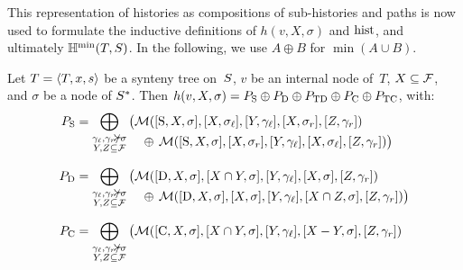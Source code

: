This representation of histories as compositions of sub-histories and paths is now used to formulate the inductive definitions of \(h(v, X, \sigma)\) and \(\mathrm{hist}\), and ultimately \(\mathbb{H}^{\mathrm{min}}(T, S)\).
In the following, we use \(A \oplus B\) for \(\min(A \cup B)\).

\begin{theorem}\label{thm:synesth:minimal-history}
    Let \(T = \left\langle T, x, s\right\rangle\) be a synteny tree on~\(S\),
    \(v\) be an internal node of~\(T\),
    \(X \subseteq \mathcal{F}\), and
    \(\sigma\) be a node of \(S^*\).
    Then \(h(v, X, \sigma) = P_{\mathrm{S}} \oplus P_{\mathrm{D}} \oplus P_{\mathrm{TD}} \oplus P_{\mathrm{C}} \oplus P_{\mathrm{TC}}\), with:
    {\allowdisplaybreaks\begin{align*}
        P_{\evtS} &= \bigoplus_{\substack{
            \gamma\lchild, \gamma\rchild \nottancsneq \sigma \\
            Y, Z \subseteq \geneFamilySet
        }} \begin{aligned}[t]
            &\big(
                \mergeHist([\evtS, X, \sigma], [X, \sigma\lchild], [Y, \gamma\lchild], [X, \sigma\rchild], [Z, \gamma\rchild]) \\
            &\quad\oplus\,
                \mergeHist([\evtS, X, \sigma], [X, \sigma\rchild], [Y, \gamma\lchild], [X, \sigma\lchild], [Z, \gamma\rchild])\big)
        \end{aligned} \\[1.5ex]
        P_{\evtD} &= \bigoplus_{\substack{
            \gamma\lchild, \gamma\rchild \nottancsneq \sigma \\
            Y, Z \subseteq \geneFamilySet
        }} \begin{aligned}[t]
            &\big(
                \mergeHist([\evtD, X, \sigma], [X \cap Y, \sigma], [Y, \gamma\lchild], [X, \sigma], [Z, \gamma\rchild]) \\
            &\quad\oplus\,
                \mergeHist([\evtD, X, \sigma], [X, \sigma], [Y, \gamma\lchild], [X \cap Z, \sigma], [Z, \gamma\rchild])\big)
        \end{aligned} \\[1.5ex]
        P_{\evtC} &= \bigoplus_{\substack{
            \gamma\lchild, \gamma\rchild \nottancsneq \sigma \\
            Y, Z \subseteq \geneFamilySet
        }} \begin{aligned}[t]
            &\big(
                \mergeHist([\evtC, X, \sigma], [X \cap Y, \sigma], [Y, \gamma\lchild], [X - Y, \sigma], [Z, \gamma\rchild]) \\

\end{aligned}
\end{align*}}
\end{theorem}
